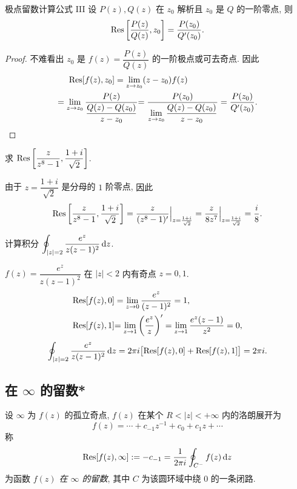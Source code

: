 \begin{second}{极点留数计算公式 III}
	设 $P(z),Q(z)$ 在 $z_0$ 解析且 $z_0$ 是 $Q$ 的一阶零点, 则
	\[{\mathrm{Res}}\left[\frac{P(z)}{Q(z)},z_0\right]=\frac{P(z_0)}{Q'(z_0)}.\]
\end{second}

\begin{proof}
		不难看出 $z_0$ 是 $f(z)=\dfrac{P(z)}{Q(z)}$ 的一阶极点或可去奇点.
	{因此
		\begin{align*}
			&\peq\Res[f(z),z_0]=\lim_{z\to z_0}(z-z_0)f(z)\\
			&{=\lim_{z\to z_0}\frac{P(z)}{\dfrac{Q(z)-Q(z_0)}{z-z_0}}}
			{=\frac{P(z_0)}{\lim\limits_{z\to z_0}\dfrac{Q(z)-Q(z_0)}{z-z_0}}=\frac{P(z_0)}{Q'(z_0)}.\qedhere}
		\end{align*}
	}
\end{proof}

\begin{example}
	求 ${\mathrm{Res}}\left[\dfrac{z}{z^8-1},\dfrac{1+i}{\sqrt2}\right]$.
\end{example}

\begin{solution}
		由于 $z=\dfrac{1+i}{\sqrt2}$ 是分母的 $1$ 阶零点,
	{因此
		\[{\mathrm{Res}}\left[\frac z{z^8-1},\frac{1+i}{\sqrt2}\right]
		=\frac z{(z^8-1)'}\Big|_{z=\frac{1+i}{\sqrt2}}
		=\frac z{8z^7}\Big|_{z=\frac{1+i}{\sqrt2}}
		=\frac i8.\]
	}
\end{solution}


\begin{example}
	计算积分 $\displaystyle\oint_{|z|=2}\frac{e^z}{z(z-1)^2}\,\mathrm{d} z$.
\end{example}

\begin{solution}
		$f(z)=\dfrac{e^z}{z(z-1)^2}$ 在 $|z|<2$ 内有奇点 $z=0,1$.
	{\begin{align*}
		{\mathrm{Res}}[f(z),0]&=\lim_{z\to0}\frac{e^z}{(z-1)^2}=1,\\
		{{\mathrm{Res}}[f(z),1]}&{=\lim_{z\to1}\left(\frac{e^z}z\right)'=\lim_{z\to1}\frac{e^z(z-1)}{z^2}=0,}
	\end{align*}\[\oint_{|z|=2}\frac{e^z}{z(z-1)^2}\,\mathrm{d} z
		=2\pi i\bigl[{\mathrm{Res}}[f(z),0]+{\mathrm{Res}}[f(z),1]\bigr]
		=2\pi i.\]
	}
\end{solution}

\subsection{在 \texorpdfstring{$\infty$}{∞} 的留数*}

\begin{definition}
	设 $\infty$ 为 $f(z)$ 的孤立奇点, $f(z)$ 在某个 $R<|z|<+\infty$ 内的洛朗展开为
	\[f(z)=\cdots+c_{-1}z^{-1}+c_0+c_1z+\cdots\]
	称
	\[{\mathrm{Res}}[f(z),\infty]:=-c_{-1}=\frac1{2\pi i}\oint_{C^-}f(z)\,\mathrm{d} z\]
	为函数 \emph{$f(z)$ 在 $\infty$ 的留数}, 其中 $C$ 为该圆环域中绕 $0$ 的一条闭路.
\end{definition}

